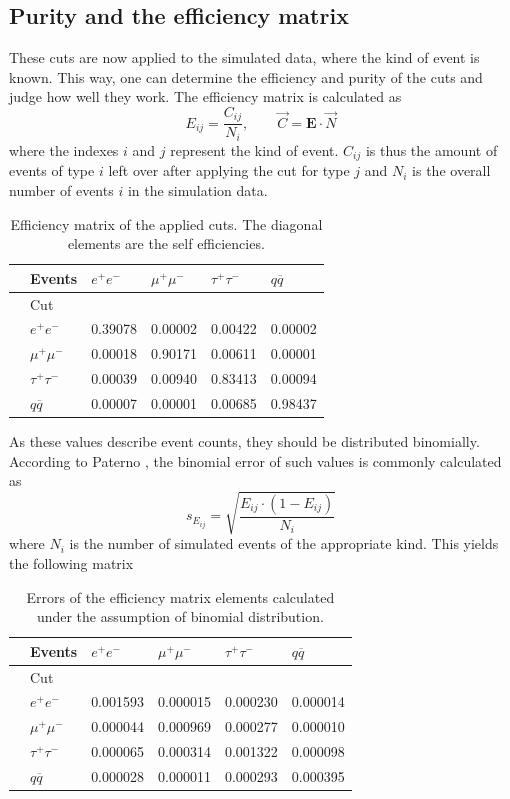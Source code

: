 \subsection{Purity and the efficiency matrix}
These cuts are now applied to the simulated data, where the kind of event is known. This way, one can determine the efficiency and purity of the cuts and judge how well they work. 
The efficiency matrix is calculated as
\begin{equation}
E_{ij}=\frac{C_{ij}}{N_i},\qquad \vec{C}=\boldsymbol{E}\cdot\vec{N}
\end{equation}
where the indexes $i$ and $j$ represent the kind of event. $C_{ij}$ is thus the amount of events of type $i$ left over after applying the cut for type $j$ and $N_i$ is the overall number of events $i$ in the simulation data.
\begin{table}[H]\centering
	\begin{tabular}{@{}llllll@{}}
		\toprule
		&Events &$e^+e^-$&$\mu^+\mu^-$&$\tau^+\tau^-$&$q\overline{q}$\\
		\midrule
		&Cut&&&&\\
		&$e^+e^-$&0.39078&0.00002&0.00422&0.00002\\
		&$\mu^+\mu^-$&0.00018&0.90171&0.00611&0.00001\\
		&$\tau^+\tau^-$&0.00039&0.00940&0.83413&0.00094\\
		&$q\overline{q}$&0.00007&0.00001&0.00685&0.98437\\
	\end{tabular}
	\caption[Efficiency matrix]{Efficiency matrix of the applied cuts. The diagonal elements are the self efficiencies.}
	\label{tb:efficiency}
\end{table}

As these values describe event counts, they should be distributed binomially. According to Paterno \cite{binpaper}, the binomial error of such values is commonly calculated as
\begin{equation}
s_{E_{ij}}=\sqrt{\frac{E_{ij}\cdot(1-E_{ij})}{N_i}}
\end{equation}
where $N_i$ is the number of simulated events of the appropriate kind. This yields the following matrix

\begin{table}[H]\centering
	\begin{tabular}{@{}llllll@{}}
		\toprule
		&Events &$e^+e^-$&$\mu^+\mu^-$&$\tau^+\tau^-$&$q\overline{q}$\\
		\midrule
		&Cut&&&&\\
		&$e^+e^-$&0.001593&0.000015&0.000230&0.000014\\
		&$\mu^+\mu^-$&0.000044&0.000969&0.000277&0.000010\\
		&$\tau^+\tau^-$&0.000065&0.000314&0.001322&0.000098\\
		&$q\overline{q}$&0.000028&0.000011&0.000293&0.000395\\
		\bottomrule
	\end{tabular}
	\caption[Efficiency error matrix]{Errors of the efficiency matrix elements calculated under the assumption of binomial distribution.}
	\label{tb:efficiencyerr}
\end{table}

